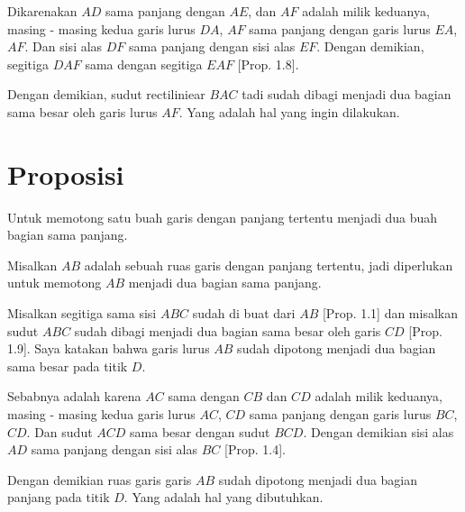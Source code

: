 \documentclass[a4paper]{book}
\begin{document}
Dikarenakan $AD$ sama panjang dengan $AE$, dan $AF$ adalah milik keduanya, masing - masing
kedua garis lurus $DA$, $AF$ sama panjang dengan garis lurus $EA$, $AF$. Dan 
sisi alas $DF$ sama panjang dengan sisi alas $EF$. Dengan demikian, segitiga
$DAF$ sama dengan segitiga $EAF$ [Prop. 1.8].

Dengan demikian, sudut rectiliniear $BAC$ tadi sudah dibagi menjadi dua bagian
sama besar oleh garis lurus $AF$. Yang adalah hal yang ingin dilakukan.

\section*{\centering Proposisi \thesection} 
Untuk memotong satu buah garis dengan panjang tertentu menjadi dua buah bagian 
sama panjang.

\begin{center}
\end{center}

Misalkan $AB$ adalah sebuah ruas garis dengan panjang tertentu, jadi diperlukan
untuk memotong $AB$ menjadi dua bagian sama panjang.

Misalkan segitiga sama sisi $ABC$ sudah di buat dari $AB$ [Prop. 1.1] dan
misalkan sudut $ABC$ sudah dibagi menjadi dua bagian sama besar oleh garis 
$CD$ [Prop. 1.9]. Saya katakan bahwa garis lurus $AB$ sudah dipotong menjadi
dua bagian sama besar pada titik $D$.

Sebabnya adalah karena $AC$ sama dengan $CB$ dan $CD$ adalah milik keduanya, masing - masing
kedua garis lurus $AC$, $CD$ sama panjang dengan garis lurus $BC$, $CD$. Dan 
sudut $ACD$ sama besar dengan sudut $BCD$. Dengan demikian sisi alas $AD$ sama
panjang dengan sisi alas $BC$ [Prop. 1.4].

Dengan demikian ruas garis garis $AB$ sudah dipotong menjadi dua bagian panjang
pada titik $D$. Yang adalah hal yang dibutuhkan.

\end{document}
